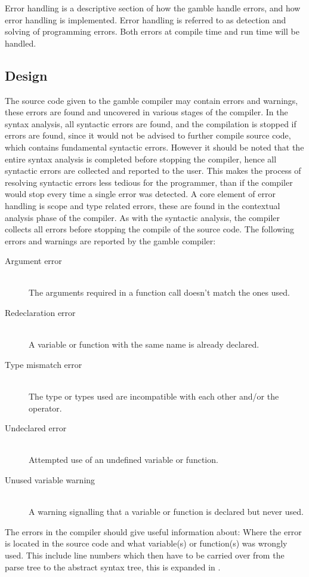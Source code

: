 Error handling is a descriptive section of how the \gls{gamble} handle errors, and how error handling is implemented.
Error handling is referred to as detection and solving of programming errors.
Both errors at compile time and run time will be handled.
\subsection*{Design}\label{subsec:DesignErrorHandling}
The source code given to the \gls{gamble} compiler may contain errors and warnings, these errors are found and uncovered in various stages of the compiler.   
In the syntax analysis, all syntactic errors are found, and the compilation is stopped if errors are found, since it would not be advised to further compile source code, which contains fundamental syntactic errors.
However it should be noted that the entire syntax analysis is completed before stopping the compiler, hence all syntactic errors are collected and reported to the user.
This makes the process of resolving syntactic errors less tedious for the programmer, than if the compiler would stop every time a single error was detected. 
A core element of error handling is scope and type related errors, these are found in the contextual analysis phase of the compiler.
As with the syntactic analysis, the compiler collects all errors before stopping the compile of the source code. 
The following errors and warnings are reported by the \gls{gamble} compiler:
\begin{description}
	\item[Argument error]\hfill\\ 
	The arguments required in a function call doesn't match the ones used.
	\item[Redeclaration error]\hfill\\ 
	A variable or function with the same name is already declared.
	\item[Type mismatch error]\hfill\\ 
	The type or types used are incompatible with each other and/or the operator. 
	\item[Undeclared error]\hfill\\ 
	Attempted use of an undefined variable or function.
	\item[Unused variable warning]\hfill\\ 
	A warning signalling that a variable or function is declared but never used.
\end{description} 
The errors in the compiler should give useful information about: Where the error is located in the source code and what variable(s) or function(s) was wrongly used.
This include line numbers which then have to be carried over from the parse tree to the abstract syntax tree, this is expanded in .

